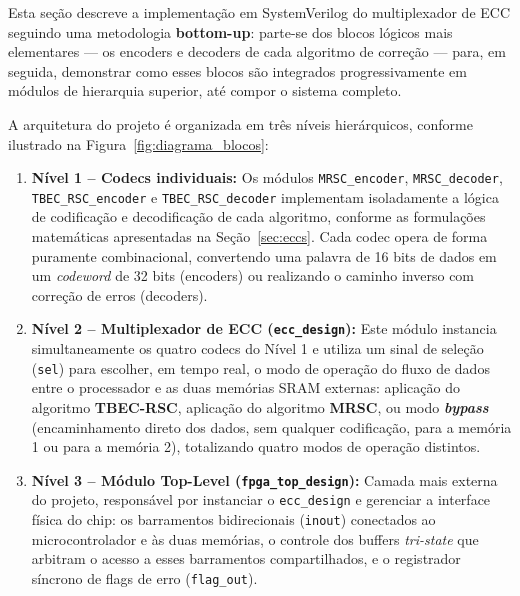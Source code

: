 \documentclass[12pt,a4paper]{article}
\begin{document}
Esta seção descreve a implementação em SystemVerilog do multiplexador de ECC 
seguindo uma metodologia \textbf{bottom-up}: parte-se dos blocos lógicos mais 
elementares — os encoders e decoders de cada algoritmo de correção — para, 
em seguida, demonstrar como esses blocos são integrados progressivamente em 
módulos de hierarquia superior, até compor o sistema completo.

A arquitetura do projeto é organizada em três níveis hierárquicos, conforme 
ilustrado na Figura~\ref{fig:diagrama_blocos}:

\begin{enumerate}
    \item \textbf{Nível 1 -- Codecs individuais:} Os módulos \texttt{MRSC\_encoder}, 
    \texttt{MRSC\_decoder}, \\ \texttt{TBEC\_RSC\_encoder} e \texttt{TBEC\_RSC\_decoder} 
    implementam isoladamente a lógica de codificação e decodificação de cada 
    algoritmo, conforme as formulações matemáticas apresentadas na 
    Seção~\ref{sec:eccs}. Cada codec opera de forma puramente combinacional, 
    convertendo uma palavra de 16 bits de dados em um \textit{codeword} de 
    32 bits (encoders) ou realizando o caminho inverso com correção de erros 
    (decoders).
    
    \item \textbf{Nível 2 -- Multiplexador de ECC (\texttt{ecc\_design}):} Este 
    módulo instancia simultaneamente os quatro codecs do Nível 1 e utiliza um 
    sinal de seleção (\texttt{sel}) para escolher, em tempo real, o modo de 
    operação do fluxo de dados entre o processador e as duas memórias SRAM 
    externas: aplicação do algoritmo \textbf{TBEC-RSC}, aplicação do algoritmo 
    \textbf{MRSC}, ou modo \textbf{\textit{bypass}} (encaminhamento direto dos 
    dados, sem qualquer codificação, para a memória 1 ou para a memória 2), 
    totalizando quatro modos de operação distintos.
    
    \item \textbf{Nível 3 -- Módulo Top-Level (\texttt{fpga\_top\_design}):} 
    Camada mais externa do projeto, responsável por instanciar o 
    \texttt{ecc\_design} e gerenciar a interface física do chip: os barramentos 
    bidirecionais (\texttt{inout}) conectados ao microcontrolador e às duas 
    memórias, o controle dos buffers \textit{tri-state} que arbitram o acesso 
    a esses barramentos compartilhados, e o registrador síncrono de flags de 
    erro (\texttt{flag\_out}).
\end{enumerate}
\end{document}
